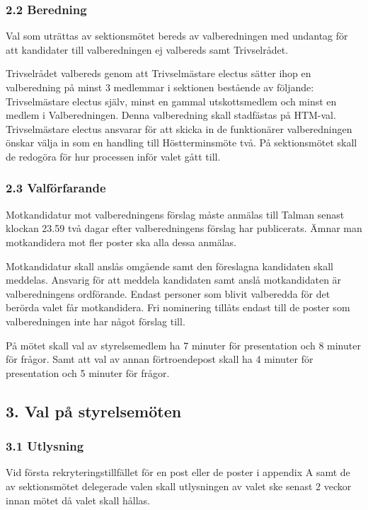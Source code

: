 \documentclass{dsekkallelse}
\begin{document}
\subsubsection{2.2 Beredning}
Val som uträttas av sektionsmötet bereds av valberedningen med undantag för att kandidater till valberedningen ej valbereds samt Trivselrådet. 

Trivselrådet valbereds genom att Trivselmästare electus sätter ihop en valberedning på minst 3 medlemmar i sektionen bestående av
följande: Trivselmästare electus själv, minst en gammal utskottsmedlem och minst en medlem i Valberedningen. Denna valberedning skall stadfästas på HTM-val. Trivselmästare electus ansvarar för att skicka in de funktionärer valberedningen önskar välja in som
en handling till Höstterminsmöte två. På sektionsmötet skall de redogöra för hur processen inför valet gått till.

\subsubsection{2.3 Valförfarande}
Motkandidatur mot valberedningens förslag måste anmälas till Talman senast klockan 23.59 två dagar efter valberedningens förslag har publicerats. Ämnar man motkandidera mot fler poster ska alla dessa anmälas.

Motkandidatur skall anslås omgående samt den föreslagna kandidaten skall meddelas. Ansvarig för att meddela kandidaten samt anslå motkandidaten är valberedningens ordförande. Endast personer som blivit valberedda för det berörda valet får motkandidera.
Fri nominering tillåts endast till de poster som valberedningen inte har något förslag till.

På mötet skall val av styrelsemedlem ha 7 minuter för presentation och 8 minuter för frågor. Samt att val av annan förtroendepost skall ha 4 minuter för presentation och 5 minuter för frågor.

\subsection{3. Val på styrelsemöten}

\subsubsection{3.1 Utlysning}
Vid första rekryteringstillfället för en post eller de poster i appendix A samt de av sektionsmötet delegerade valen skall utlysningen av valet ske senast 2 veckor innan mötet då valet skall hållas. 
\end{document}
